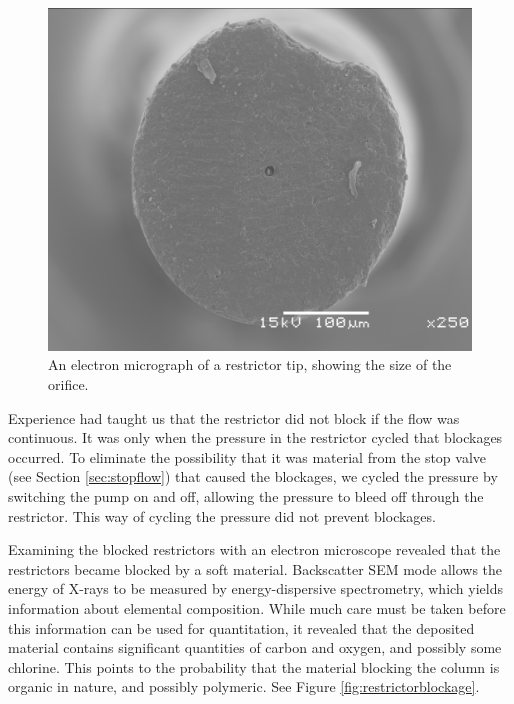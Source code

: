 \begin{figure}
\centering
\includegraphics[width=\textwidth]{Figures/sem_h_001.png}
\decoRule

\caption[A electron microscope photo of a restrictor orifice]{An electron
micrograph of a restrictor tip, showing the size of the orifice.}

\label{fig:restrictororifice}
\end{figure}

Experience had taught us that the restrictor did not block if the flow was
continuous. It was only when the pressure in the restrictor cycled that
blockages occurred. To eliminate the possibility that it was material from the
stop valve (see Section \ref{sec:stopflow}) that caused the blockages, we cycled
the pressure by switching the pump on and off, allowing the pressure to bleed
off through the restrictor. This way of cycling the pressure did not prevent
blockages.

Examining the blocked restrictors with an electron microscope revealed that the
restrictors became blocked by a soft material. Backscatter SEM mode allows the
energy of X-rays to be measured by energy-dispersive spectrometry, which yields
information about elemental composition. While much care must be taken before
this information can be used for quantitation, it revealed that the deposited
material contains significant quantities of carbon and oxygen, and possibly some
chlorine. This points to the probability that the material blocking the column
is organic in nature, and possibly polymeric. See Figure
\ref{fig:restrictorblockage}.

